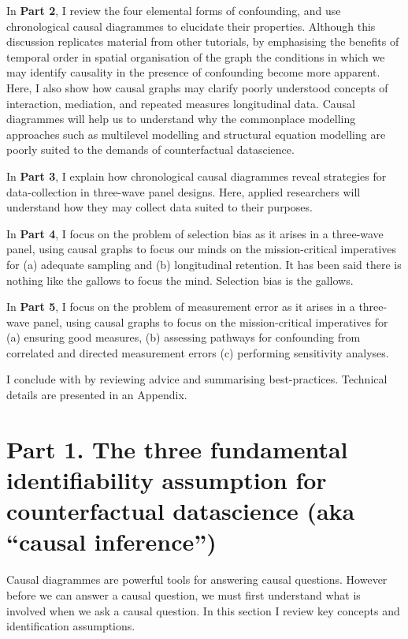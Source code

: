 \documentclass[
  singlecolumn]{report}
\begin{document}
In \textbf{Part 2}, I review the four elemental forms of confounding,
and use chronological causal diagrammes to elucidate their properties.
Although this discussion replicates material from other tutorials, by
emphasising the benefits of temporal order in spatial organisation of
the graph the conditions in which we may identify causality in the
presence of confounding become more apparent. Here, I also show how
causal graphs may clarify poorly understood concepts of interaction,
mediation, and repeated measures longitudinal data. Causal diagrammes
will help us to understand why the commonplace modelling approaches such
as multilevel modelling and structural equation modelling are poorly
suited to the demands of counterfactual datascience.

In \textbf{Part 3}, I explain how chronological causal diagrammes reveal
strategies for data-collection in three-wave panel designs. Here,
applied researchers will understand how they may collect data suited to
their purposes.

In \textbf{Part 4}, I focus on the problem of selection bias as it
arises in a three-wave panel, using causal graphs to focus our minds on
the mission-critical imperatives for (a) adequate sampling and (b)
longitudinal retention. It has been said there is nothing like the
gallows to focus the mind. Selection bias is the gallows.

In \textbf{Part 5}, I focus on the problem of measurement error as it
arises in a three-wave panel, using causal graphs to focus on the
mission-critical imperatives for (a) ensuring good measures, (b)
assessing pathways for confounding from correlated and directed
measurement errors (c) performing sensitivity analyses.

I conclude with by reviewing advice and summarising best-practices.
Technical details are presented in an Appendix.

\hypertarget{part-1.-the-three-fundamental-identifiability-assumption-for-counterfactual-datascience-aka-causal-inference}{%
\section{Part 1. The three fundamental identifiability assumption for
counterfactual datascience (aka ``causal
inference'')}\label{part-1.-the-three-fundamental-identifiability-assumption-for-counterfactual-datascience-aka-causal-inference}}

Causal diagrammes are powerful tools for answering causal questions.
However before we can answer a causal question, we must first understand
what is involved when we ask a causal question. In this section I review
key concepts and identification assumptions.
\end{document}

